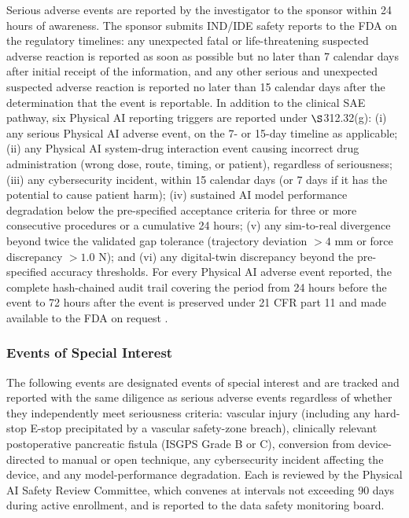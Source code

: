 Serious adverse events are reported by the investigator to the sponsor within
24 hours of awareness. The sponsor submits IND/IDE safety reports to the FDA on the
regulatory timelines: any unexpected fatal or life-threatening suspected adverse
reaction is reported as soon as possible but no later than 7 calendar days after
initial receipt of the information, and any other serious and unexpected suspected
adverse reaction is reported no later than 15 calendar days after the determination
that the event is reportable. In addition to the clinical SAE pathway, six Physical
AI reporting triggers are reported under $\S$312.32(g): (i) any serious Physical AI
adverse event, on the 7- or 15-day timeline as applicable; (ii) any Physical AI
system-drug interaction event causing incorrect drug administration (wrong dose,
route, timing, or patient), regardless of seriousness; (iii) any cybersecurity
incident, within 15 calendar days (or 7 days if it has the potential to cause
patient harm); (iv) sustained AI model performance degradation below the
pre-specified acceptance criteria for three or more consecutive procedures or a
cumulative 24 hours; (v) any sim-to-real divergence beyond twice the validated gap
tolerance (trajectory deviation $> 4$ mm or force discrepancy $> 1.0$ N); and (vi)
any digital-twin discrepancy beyond the pre-specified accuracy thresholds. For every
Physical AI adverse event reported, the complete hash-chained audit trail covering
the period from 24 hours before the event to 72 hours after the event is preserved
under 21 CFR part 11 and made available to the FDA on request
\cite{ecfr2026part11}.

\subsubsection{Events of Special Interest}

The following events are designated events of special interest and are tracked and
reported with the same diligence as serious adverse events regardless of whether
they independently meet seriousness criteria: vascular injury (including any
hard-stop E-stop precipitated by a vascular safety-zone breach), clinically relevant
postoperative pancreatic fistula (ISGPS Grade B or C), conversion from device-directed
to manual or open technique, any cybersecurity incident affecting the device, and any
model-performance degradation. Each is reviewed by the Physical AI Safety Review
Committee, which convenes at intervals not exceeding 90 days during active
enrollment, and is reported to the data safety monitoring board.

